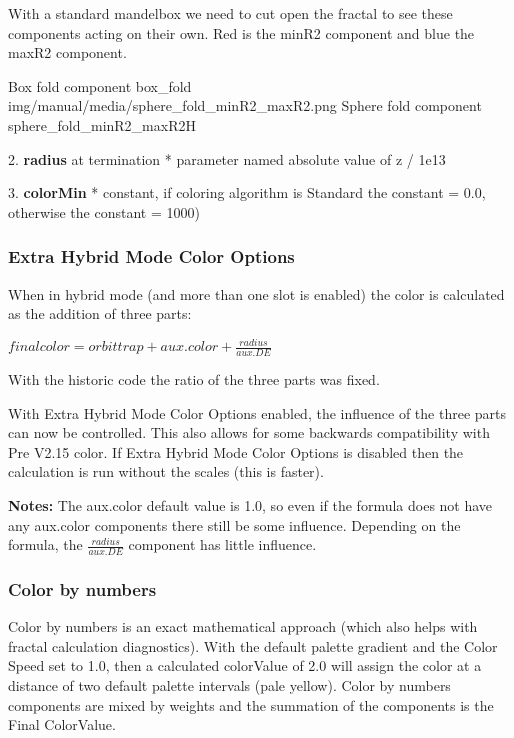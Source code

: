With a standard mandelbox we need to cut open the fractal to see these  components acting on their own. Red is the minR2 component and blue the maxR2 component.

{Box fold component}
{box_fold}
{img/manual/media/sphere_fold_minR2_maxR2.png}
{Sphere fold component}
{sphere_fold_minR2_maxR2}{H}


2. \textbf{radius} at termination * parameter named absolute value of z  / 1e13 


3. \textbf{colorMin} * constant, if coloring algorithm is Standard the constant = 0.0, otherwise the constant = 1000)





\subsubsection{Extra Hybrid Mode Color Options}\label{materials-extra-hybrid-mode-color-options}

When in hybrid mode (and more than one slot is enabled) the color is calculated as the addition of three parts:

\(final color = orbit trap  +  aux.color  +  \frac{radius}{aux.DE}\)

With the historic code the ratio of the three parts was fixed.

With Extra Hybrid Mode Color Options enabled, the influence of the three parts can now be controlled. This also allows for some backwards compatibility with Pre V2.15 color. If Extra Hybrid Mode Color Options is disabled then the calculation is run without the scales (this is faster).

\textbf{Notes: }The aux.color default value is 1.0, so even if the formula does not have any aux.color components there still be some influence. Depending on the formula, the \(\frac{radius}{aux.DE}\) component has little influence.

\subsubsection{Color by numbers}\label{materials-color-by-numbers}

Color by numbers is an exact mathematical approach (which also helps with fractal calculation diagnostics).
With the default palette gradient and the Color Speed set to 1.0, then a calculated colorValue of 2.0 will assign the color at a distance of two default palette intervals (pale yellow).
Color by numbers components are mixed by weights and the summation of the components is the Final ColorValue.

